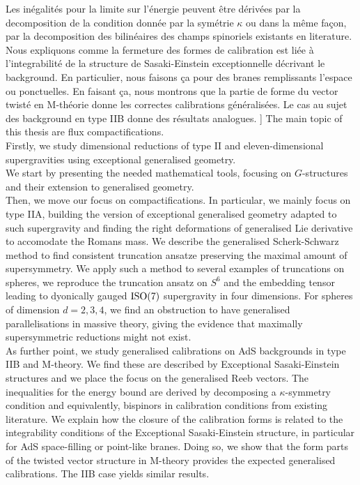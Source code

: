 \documentclass[draft]{phd}
\begin{document}
			Les inégalités pour la limite sur l'énergie peuvent être dérivées par la decomposition de la condition donnée par la symétrie $\kappa$ ou dans la même façon, par la decomposition des bilinéaires des champs spinoriels existants en literature.
			Nous expliquons comme la fermeture des formes de calibration est liée à l'integrabilité de la structure de Sasaki-Einstein exceptionnelle décrivant le background.
			En particulier, nous faisons ça pour des branes remplissants l'espace ou ponctuelles.
			En faisant ça, nous montrons que la partie de forme du vector twisté en M-théorie donne les correctes calibrations généralisées.
			Le cas au sujet des background en type IIB donne des résultats analogues.%
		]{%
					The main topic of this thesis are flux compactifications.\\
					Firstly, we study dimensional reductions of type II and eleven-dimensional supergravities using exceptional generalised geometry.\\
					We start by presenting the needed mathematical tools, focusing on $G$-structures and their extension to generalised geometry.\\
					Then, we move our focus on compactifications. 
					In particular, we mainly focus on type IIA, building the version of exceptional generalised geometry adapted to such supergravity and finding the right deformations of generalised Lie derivative to accomodate the Romans mass.
					We describe the generalised Scherk-Schwarz method to find consistent truncation ansatze preserving the maximal amount of supersymmetry.
					We apply such a method to several examples of truncations on spheres, we reproduce the truncation ansatz on $S^6$ and the embedding tensor leading to dyonically gauged $\mathrm{ISO}(7)$ supergravity in four dimensions.
					For spheres of dimension $d=2,3,4$, we find an obstruction to have generalised parallelisations in massive theory, giving the evidence that maximally supersymmetric reductions might not exist.\\			
					As further point, we study generalised calibrations on AdS backgrounds in type IIB and M-theory. 
					We find these are described by Exceptional Sasaki-Einstein structures and we place the focus on the generalised Reeb vectors. 
					The inequalities for the energy bound are derived by decomposing a $\kappa$-symmetry condition and equivalently, bispinors in calibration conditions from existing literature. 
					We explain how the closure of the calibration forms is related to the integrability conditions of the Exceptional Sasaki-Einstein structure, in particular for AdS space-filling or point-like branes. 
					Doing so, we show that the form parts of the twisted vector structure in M-theory provides the expected generalised calibrations. 
					The IIB case yields similar results.
				}
\end{document}
